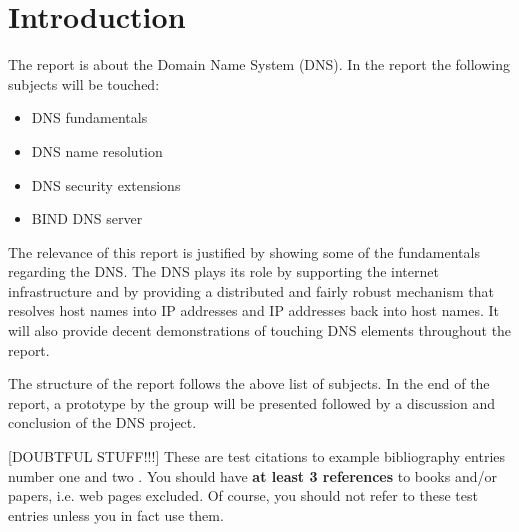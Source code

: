 \chapter{Introduction}

The report is about the Domain Name System (DNS). In the report the following subjects will be touched:

\begin{itemize}
\item DNS fundamentals
\item DNS name resolution
\item DNS security extensions
\item BIND DNS server
\end{itemize}

The relevance of this report is justified by showing some of the fundamentals regarding the DNS.
The DNS plays its role by supporting the internet infrastructure and by providing a distributed and fairly robust mechanism that resolves host names into IP addresses and IP addresses back into host names. It will also provide decent demonstrations of touching DNS elements throughout the report.

The structure of the report follows the above list of subjects. In the end of the report, a prototype by the group will be presented followed by a discussion and conclusion of the DNS project.

[DOUBTFUL STUFF!!!]
These are test citations to example bibliography entries number one
\cite{1989_graham_1} and two \cite{2003_simpson_1}. You should have
\textbf{at least 3 references} to books and/or papers, i.e. web pages
excluded. Of course, you should not refer to these test entries unless
you in fact use them. 